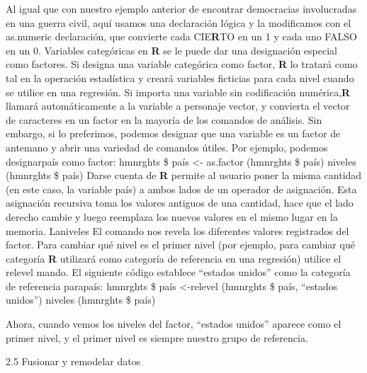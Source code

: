 \documentclass[
]{book}
\begin{document}
Al igual que con nuestro ejemplo anterior de encontrar democracias involucradas en una guerra civil, aquí usamos una declaración lógica y la modificamos con el as.numeric declaración, que convierte cada CIE\textbf{R}TO en un 1 y cada uno FALSO en un 0.
Variables categóricas en \textbf{R} se le puede dar una designación especial como factores. Si
designa una variable categórica como factor, \textbf{R} lo tratará como tal en la operación estadística y creará variables ficticias para cada nivel cuando se utilice en una regresión. Si importa una variable sin codificación numérica,\textbf{R} llamará automáticamente a la variable a personaje vector, y convierta el vector de caracteres en un factor en la mayoría de los comandos de análisis. Sin embargo, si lo preferimos, podemos designar que una variable es un factor de antemano y abrir una variedad de comandos útiles. Por ejemplo, podemos designarpaís como factor:
hmnrghts \$ país \textless- as.factor (hmnrghts \$ país) niveles (hmnrghts \$ país)
Darse cuenta de \textbf{R} permite al usuario poner la misma cantidad (en este caso, la variable
país) a ambos lados de un operador de asignación. Esta asignación recursiva toma los valores antiguos de una cantidad, hace que el lado derecho cambie y luego reemplaza los nuevos valores en el mismo lugar en la memoria. Laniveles El comando nos revela los diferentes valores registrados del factor.
Para cambiar qué nivel es el primer nivel (por ejemplo, para cambiar qué categoría \textbf{R} utilizará como categoría de referencia en una regresión) utilice el relevel mando. El siguiente código establece ``estados unidos'' como la categoría de referencia parapaís:
hmnrghts \$ país \textless-relevel (hmnrghts \$ país, ``estados unidos'') niveles (hmnrghts \$ país)

Ahora, cuando vemos los niveles del factor, ``estados unidos'' aparece como el primer nivel, y el primer nivel es siempre nuestro grupo de referencia.

2.5 Fusionar y remodelar datos
\end{document}
